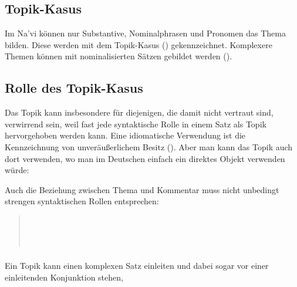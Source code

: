 \subsection{Topik-Kasus} Im Na'vi können nur Substantive, Nominalphrasen und Pronomen das Thema bilden. Diese werden mit dem Topik-Kasus () gekennzeichnet. Komplexere Themen können mit nominalisierten Sätzen gebildet werden ().

\subsection{Rolle des Topik-Kasus} \label{pragma:topical-role}
Das Topik kann insbesondere für diejenigen, die damit nicht vertraut sind, verwirrend sein, weil fast jede syntaktische Rolle in einem Satz als Topik hervorgehoben werden kann. Eine idiomatische Verwendung ist die Kennzeichnung von unveräußerlichem Besitz (). Aber man kann das Topik auch dort verwenden, wo man im Deutschen einfach ein direktes Objekt verwenden würde:

\begin{quotation}
\noindent{}

\indent{} 
\end{quotation}

\noindent Auch die Beziehung zwischen Thema und Kommentar muss nicht unbedingt strengen syntaktischen Rollen entsprechen:

\begin{quotation}
\noindent{}\\
\indent{}

\medskip
\noindent{}\\
\indent{}
\end{quotation}

\subsubsection{} Ein Topik kann einen komplexen Satz einleiten und dabei sogar vor einer einleitenden Konjunktion stehen,


